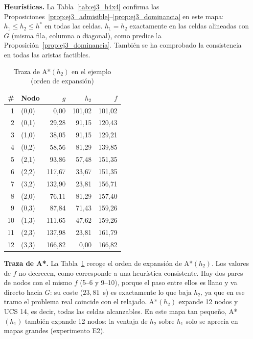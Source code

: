 \textbf{Heurísticas.} La Tabla~\ref{tab:ej3_h4x4} confirma las
Proposiciones~\ref{prop:ej3_admisible}--\ref{prop:ej3_dominancia} en este
mapa: $h_1 \le h_2 \le h^*$ en todas las celdas. $h_1 = h_2$ exactamente en
las celdas alineadas con $G$ (misma fila, columna o diagonal), como predice la
Proposición~\ref{prop:ej3_dominancia}. También se ha comprobado la
consistencia en todas las aristas factibles.

\begin{table}[t]
  \centering
  \caption{Traza de A*$(h_2)$ en el ejemplo (orden de expansión)}
  \label{tab:ej3_traza4x4}
  \footnotesize
  \begin{tabular}{@{}rlrrr@{}}
    \toprule
    \# & Nodo & $g$ & $h_2$ & $f$ \\
    \midrule
    1  & (0,0) & 0,00   & 101,02 & 101,02 \\
    2  & (0,1) & 29,28  & 91,15  & 120,43 \\
    3  & (1,0) & 38,05  & 91,15  & 129,21 \\
    4  & (0,2) & 58,56  & 81,29  & 139,85 \\
    5  & (2,1) & 93,86  & 57,48  & 151,35 \\
    6  & (2,2) & 117,67 & 33,67  & 151,35 \\
    7  & (3,2) & 132,90 & 23,81  & 156,71 \\
    8  & (2,0) & 76,11  & 81,29  & 157,40 \\
    9  & (0,3) & 87,84  & 71,43  & 159,26 \\
    10 & (1,3) & 111,65 & 47,62  & 159,26 \\
    11 & (2,3) & 137,98 & 23,81  & 161,79 \\
    12 & (3,3) & 166,82 & 0,00   & 166,82 \\
    \bottomrule
  \end{tabular}
\end{table}

\textbf{Traza de A*.} La Tabla~\ref{tab:ej3_traza4x4} recoge el orden de
expansión de A*$(h_2)$. Los valores de $f$ no decrecen, como corresponde a
una heurística consistente. Hay dos pares de nodos con el mismo $f$ (5--6 y
9--10), porque el paso entre ellos es llano y va directo hacia $G$: su coste
($23{,}81$~s) es exactamente lo que baja $h_2$, ya que en ese tramo el
problema real coincide con el relajado. A*$(h_2)$ expande 12 nodos y UCS 14,
es decir, todas las celdas alcanzables. En este mapa tan pequeño,
A*$(h_1)$ también expande 12 nodos: la ventaja de $h_2$ sobre $h_1$ solo se
aprecia en mapas grandes (experimento E2).


